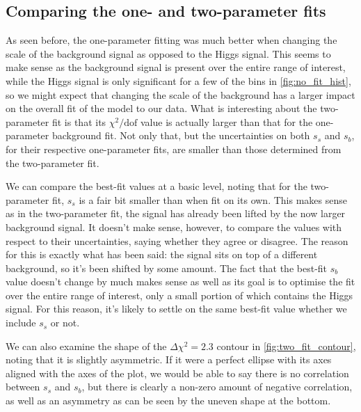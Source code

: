 \documentclass[11pt]{article}
\newcommand{\chisq}{\chi^2}
\newcommand{\chisqdof}{\chi^2/\mathrm{dof}}
\numberwithin{equation}{section}
\numberwithin{figure}{section}
\numberwithin{table}{section}
\begin{document}
\subsection{Comparing the one- and two-parameter fits}
As seen before, the one-parameter fitting was much better when changing the scale of the background signal as opposed to the Higgs signal. This seems to make sense as the background signal is present over the entire range of interest, while the Higgs signal is only significant for a few of the bins in \cref{fig:no_fit_hist}, so we might expect that changing the scale of the background has a larger impact on the overall fit of the model to our data. What is interesting about the two-parameter fit is that its $\chisqdof$ value is actually larger than that for the one-parameter background fit. Not only that, but the uncertainties on both $s_s$ and $s_b$, for their respective one-parameter fits, are smaller than those determined from the two-parameter fit. 

We can compare the best-fit values at a basic level, noting that for the two-parameter fit, $s_s$ is a fair bit smaller than when fit on its own. This makes sense as in the two-parameter fit, the signal has already been lifted by the now larger background signal. It doesn't make sense, however, to compare the values with respect to their uncertainties, saying whether they agree or disagree. The reason for this is exactly what has been said: the signal sits on top of a different background, so it's been shifted by some amount. The fact that the best-fit $s_b$ value doesn't change by much makes sense as well as its goal is to optimise the fit over the entire range of interest, only a small portion of which contains the Higgs signal. For this reason, it's likely to settle on the same best-fit value whether we include $s_s$ or not.

We can also examine the shape of the $\Delta\chisq=2.3$ contour in \cref{fig:two_fit_contour}, noting that it is slightly asymmetric. If it were a perfect ellipse with its axes aligned with the axes of the plot, we would be able to say there is no correlation between $s_s$ and $s_b$, but there is clearly a non-zero amount of negative correlation, as well as an asymmetry as can be seen by the uneven shape at the bottom.
\end{document}
